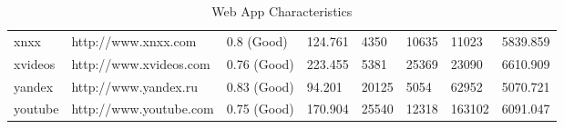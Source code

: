 \begin{table}[]
{\begin{tabular}{|l|l|l|l|l|l|l|l|}
xnxx              & http://www.xnxx.com        & 0.8 (Good)                                                                                                                                                                & 124.761                                                                           & 4350                                                           & 10635                                                         & 11023                                                                & 5839.859                                                                       \\
\rowcolor[HTML]{EFEFEF} 
xvideos           & http://www.xvideos.com     & 0.76 (Good)                                                                                                                                                               & 223.455                                                                           & 5381                                                           & 25369                                                         & 23090                                                                & 6610.909                                                                       \\
yandex            & http://www.yandex.ru       & 0.83 (Good)                                                                                                                                                               & 94.201                                                                            & 20125                                                          & 5054                                                          & 62952                                                                & 5070.721                                                                       \\
\rowcolor[HTML]{EFEFEF} 
youtube           & http://www.youtube.com     & 0.75 (Good)                                                                                                                                                               & 170.904                                                                           & 25540                                                          & 12318                                                         & 163102                                                               & 6091.047                                                                       \\ \hline
\end{tabular}%
}

\caption{Web App Characteristics}
    \label{tab:design}
\end{table}



